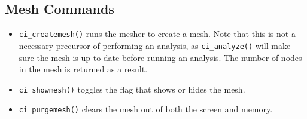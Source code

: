 \subsection{Mesh Commands}

\begin{itemize}
\item \texttt{ci\_createmesh()} runs the mesher to create a mesh. Note that this is not
a necessary precursor of performing an analysis, as
\texttt{ci\_analyze()} will make sure the mesh is up to date before
running an analysis. The number of nodes in the mesh is returned as a
result.

\item \texttt{ci\_showmesh()} toggles the flag that shows or hides the mesh.

\item \texttt{ci\_purgemesh()} clears the mesh out of both the screen and memory.
\end{itemize}

